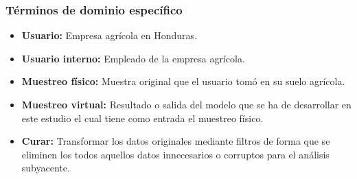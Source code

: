 \documentclass{report}
\begin{document}
\subsubsection{Términos de dominio específico}

\begin{itemize}
    \item \textbf{Usuario:} Empresa agrícola en Honduras.
    
    \item \textbf{Usuario interno:} Empleado de la empresa agrícola.
    
    \item \textbf{Muestreo físico:} Muestra original que el usuario tomó en su suelo agrícola.
    
    \item \textbf{Muestreo virtual:} Resultado o salida del modelo que se ha de desarrollar en este estudio el cual tiene como entrada el muestreo físico.
    
    \item \textbf{Curar:} Transformar los datos originales mediante filtros de forma que se eliminen los todos aquellos datos innecesarios o corruptos para el análisis subyacente.
\end{itemize}

\printbibliography
\end{document}
